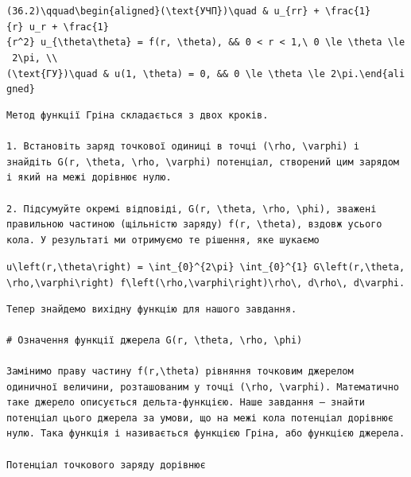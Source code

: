 \documentclass[
  ukrainian,
]{article}
\begin{document}
\texttt{(36.2)\textbackslash{}qquad\textbackslash{}begin\{aligned\}(\textbackslash{}text\{УЧП\})\textbackslash{}quad\ \&\ u\_\{rr\}\ +\ \textbackslash{}frac\{1\}\{r\}\ u\_r\ +\ \textbackslash{}frac\{1\}\{r\^{}2\}\ u\_\{\textbackslash{}theta\textbackslash{}theta\}\ =\ f(r,\ \textbackslash{}theta),\ \&\&\ 0\ \textless{}\ r\ \textless{}\ 1,\textbackslash{}\ 0\ \textbackslash{}le\ \textbackslash{}theta\ \textbackslash{}le\ 2\textbackslash{}pi,\ \textbackslash{}\textbackslash{}(\textbackslash{}text\{ГУ\})\textbackslash{}quad\ \&\ u(1,\ \textbackslash{}theta)\ =\ 0,\ \&\&\ 0\ \textbackslash{}le\ \textbackslash{}theta\ \textbackslash{}le\ 2\textbackslash{}pi.\textbackslash{}end\{aligned\}}

\begin{verbatim}
Метод функції Гріна складається з двох кроків.

1. Встановіть заряд точкової одиниці в точці (\rho, \varphi) і знайдіть G(r, \theta, \rho, \varphi) потенціал, створений цим зарядом і який на межі дорівнює нулю.

2. Підсумуйте окремі відповіді, G(r, \theta, \rho, \phi), зважені правильною частиною (щільністю заряду) f(r, \theta), вздовж усього кола. У результаті ми отримуємо те рішення, яке шукаємо
\end{verbatim}

\texttt{u\textbackslash{}left(r,\textbackslash{}theta\textbackslash{}right)\ =\ \textbackslash{}int\_\{0\}\^{}\{2\textbackslash{}pi\}\ \textbackslash{}int\_\{0\}\^{}\{1\}\ G\textbackslash{}left(r,\textbackslash{}theta,\textbackslash{}rho,\textbackslash{}varphi\textbackslash{}right)\ f\textbackslash{}left(\textbackslash{}rho,\textbackslash{}varphi\textbackslash{}right)\textbackslash{}rho\textbackslash{},\ d\textbackslash{}rho\textbackslash{},\ d\textbackslash{}varphi.}

\begin{verbatim}
Тепер знайдемо вихідну функцію для нашого завдання.

# Означення функції джерела G(r, \theta, \rho, \phi)

Замінимо праву частину f(r,\theta) рівняння точковим джерелом одиничної величини, розташованим у точці (\rho, \varphi). Математично таке джерело описується дельта-функцією. Наше завдання — знайти потенціал цього джерела за умови, що на межі кола потенціал дорівнює нулю. Така функція і називається функцією Гріна, або функцією джерела.

Потенціал точкового заряду дорівнює
\end{verbatim}
\end{document}
